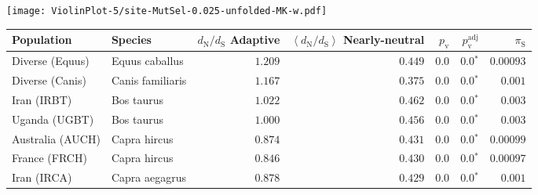 \begin{center}
\begin{adjustbox}{width = 1\textwidth}
\begin{tabular}{|l|l|r|r|r|r|r|r|r|}
\bottomrule
\end{tabular}
\end{adjustbox}
\newpage
\texttt{[image: ViolinPlot-5/site-MutSel-0.025-unfolded-MK-w.pdf]} 
\begin{adjustbox}{width = 1\textwidth}
\begin{tabular}{|l|l|r|r|r|r|r|}
\toprule
                     Population &              Species & \specialcell{$d_{\mathrm{N}} / d_{\mathrm{S}}$ \\ Adaptive} & \specialcell{$\left< d_{\mathrm{N}} / d_{\mathrm{S}} \right>$ \\ Nearly-neutral} & $p_{\mathrm{v}}$ & $p_{\mathrm{v}}^{\mathrm{adj}}$ & $\pi_{\textrm{S}}$ \\
\midrule
                Diverse (Equus) &       Equus caballus &                                           $ 1.209$ &                                           $ 0.449$ &            $0.0$ &                  $\bm{0.0{^*}}$ &          $0.00093$ \\
                Diverse (Canis) &     Canis familiaris &                                           $ 1.167$ &                                           $ 0.375$ &            $0.0$ &                  $\bm{0.0{^*}}$ &           $ 0.001$ \\
                    Iran (IRBT) &           Bos taurus &                                           $ 1.022$ &                                           $ 0.462$ &            $0.0$ &                  $\bm{0.0{^*}}$ &           $ 0.003$ \\
                  Uganda (UGBT) &           Bos taurus &                                           $ 1.000$ &                                           $ 0.456$ &            $0.0$ &                  $\bm{0.0{^*}}$ &           $ 0.003$ \\
               Australia (AUCH) &         Capra hircus &                                           $ 0.874$ &                                           $ 0.431$ &            $0.0$ &                  $\bm{0.0{^*}}$ &          $0.00099$ \\
                  France (FRCH) &         Capra hircus &                                           $ 0.846$ &                                           $ 0.430$ &            $0.0$ &                  $\bm{0.0{^*}}$ &          $0.00097$ \\
                    Iran (IRCA) &       Capra aegagrus &                                           $ 0.878$ &                                           $ 0.429$ &            $0.0$ &                  $\bm{0.0{^*}}$ &           $ 0.001$ \\

\end{tabular}
\end{adjustbox}
\end{center}
